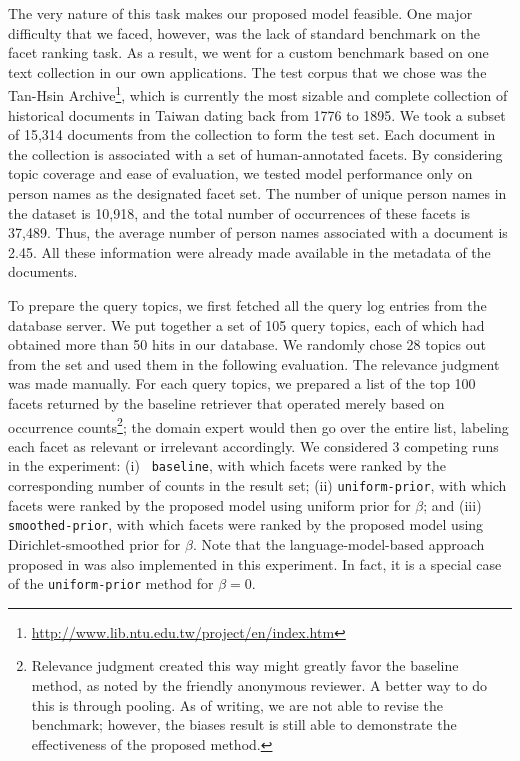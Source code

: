 
The very nature of this task makes our proposed model feasible.  One major
difficulty that we faced, however, was the lack of standard benchmark on the
facet ranking task.  As a result, we went for a custom benchmark based on one
text collection in our own applications.  The test corpus that we chose was the
Tan-Hsin
Archive\footnote{\url{http://www.lib.ntu.edu.tw/project/en/index.htm}}, which
is currently the most sizable and complete collection of historical documents
in Taiwan dating back from 1776 to 1895.  We took a subset of 15,314 documents
from the collection to form the test set.  Each document in the collection is
associated with a set of human-annotated facets.  By considering topic coverage
and ease of evaluation, we tested model performance only on person names as the
designated facet set.  The number of unique person names in the dataset is
10,918, and the total number of occurrences of these facets is 37,489.  Thus,
the average number of person names associated with a document is 2.45.  All
these information were already made available in the metadata of the documents.  

To prepare the query topics, we first fetched all the query log entries from
the database server.  We put together a set of 105 query topics, each of which
had obtained more than 50 hits in our database.  We randomly chose 28 topics
out from the set and used them in the following evaluation.  The relevance
judgment was made manually.  For each query topics, we prepared a list of the
top 100 facets returned by the baseline retriever that operated merely based on
occurrence counts\footnote{Relevance judgment created this way might greatly
favor the baseline method, as noted by the friendly anonymous reviewer.  A
better way to do this is through pooling.  As of writing, we are not able to
revise the benchmark; however, the biases result is still able to demonstrate
the effectiveness of the proposed method.}; the domain expert would then go
over the entire list, labeling each facet as relevant or irrelevant
accordingly.  We considered 3 competing runs in the experiment: (i) {\tt
baseline}, with which facets were ranked by the corresponding number of counts
in the result set; (ii) {\tt uniform-prior}, with which facets were ranked by
the proposed model using uniform prior for $\beta$; and (iii) {\tt
smoothed-prior}, with which facets were ranked by the proposed model using
Dirichlet-smoothed prior for $\beta$.  Note that the language-model-based
approach proposed in \cite{balog2009language} was also implemented in this
experiment.  In fact, it is a special case of the {\tt uniform-prior} method
for $\beta = 0$.

